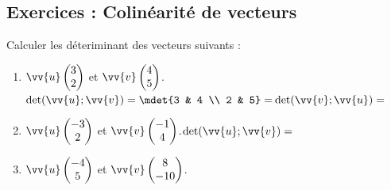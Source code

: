 \documentclass[main.tex]{subfiles}
\begin{document}
\subsection*{Exercices : Colinéarité de vecteurs}
\begin{example}
Calculer les déteriminant des vecteurs suivants :
\begin{enumerate}[label=\alph*),leftmargin=*]
\item \rule{0pt}{2em}
$\vv{u}\begin{pmatrix}
3\\2
\end{pmatrix}$ et $\vv{v}\begin{pmatrix}
4\\5
\end{pmatrix}$. \quad $\det(\vv{u};\vv{v})=\mdet{3 & 4 \\ 2 & 5}=$\vfill $\det(\vv{v};\vv{u})=$
\item  \rule{0pt}{2em}
$\vv{u}\begin{pmatrix}
-3\\2
\end{pmatrix}$ et $\vv{v}\begin{pmatrix}
-1\\4
\end{pmatrix}$.\quad $\det(\vv{u};\vv{v})=$
\item  \rule{0pt}{2em}
$\vv{u}\begin{pmatrix}
-4\\5
\end{pmatrix}$ et $\vv{v}\begin{pmatrix}
8\\-10
\end{pmatrix}$. 
\end{enumerate}
\end{example}
\end{document}
